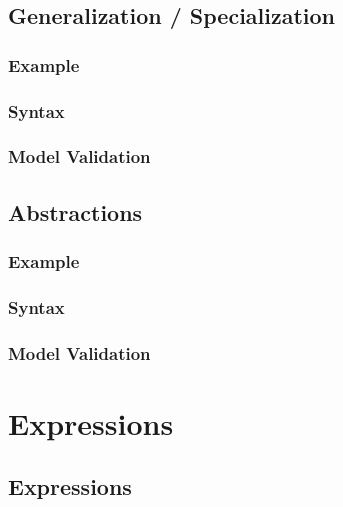 \documentclass[a4paper,oneside,12pt, extrafontsizes]{memoir}
\begin{document}
  \chapter{Generalization / Specialization}
  \label{ch:generalization}
  

    \section{Example}
    

    \section{Syntax}
    

    \section{Model Validation}
    

  \chapter{Abstractions}
  \label{ch:abstract}
  

    \section{Example}
    

    \section{Syntax}
    

    \section{Model Validation}
    

\part{Expressions}

  \chapter{Expressions}
  \label{ch:expressions}
  
\end{document}

